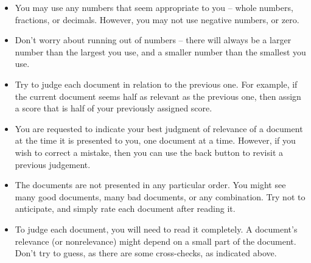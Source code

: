 \begin{itemize}
\item You may use any numbers that seem appropriate to you -- whole numbers,
  fractions, or decimals. However, you may not use negative numbers, or
  zero. 

\item Don't worry about running out of numbers -- there will always be a
  larger number than the largest you use, and a smaller number than the
  smallest you use.

\item Try to judge each document in relation to the previous one. For
  example, if the current document seems half as relevant as the
  previous one, then assign a score that is half of your previously
  assigned score. 

\item You are requested to indicate your best judgment of relevance of a
  document at the time it is presented to you, one document at a
  time. However, if you wish to correct a mistake, then you can use
  the back button to revisit a previous judgement.

\item The documents are not presented in any particular order. You might see
  many good documents, many bad documents, or any combination. Try not to
  anticipate, and simply rate each document after reading it.

\item To judge each document, you will need to read it completely.  A
  document's relevance (or nonrelevance) might depend on a small part of
  the document. Don't try to guess, as there are some cross-checks, as
  indicated above.
\end{itemize}


